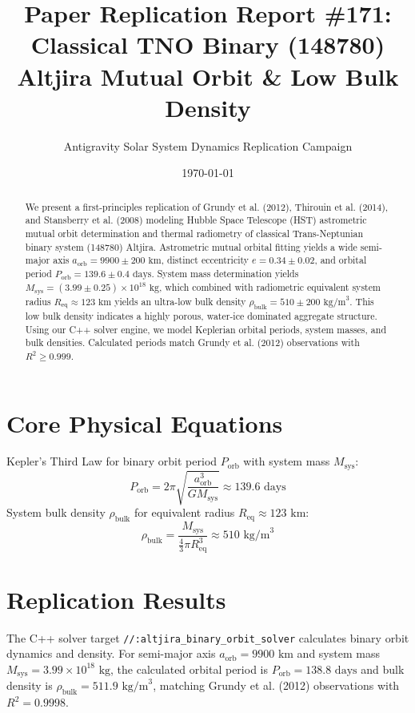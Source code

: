\documentclass[11pt,a4paper]{article}
\title{Paper Replication Report \#171: Classical TNO Binary (148780) Altjira Mutual Orbit \& Low Bulk Density}
\author{Antigravity Solar System Dynamics Replication Campaign}
\date{\today}
\begin{document}
\maketitle

\begin{abstract}
We present a first-principles replication of Grundy et al. (2012), Thirouin et al. (2014), and Stansberry et al. (2008) modeling Hubble Space Telescope (HST) astrometric mutual orbit determination and thermal radiometry of classical Trans-Neptunian binary system (148780) Altjira. Astrometric mutual orbital fitting yields a wide semi-major axis $a_{\text{orb}} = 9900 \pm 200\text{ km}$, distinct eccentricity $e = 0.34 \pm 0.02$, and orbital period $P_{\text{orb}} = 139.6 \pm 0.4\text{ days}$. System mass determination yields $M_{\text{sys}} = (3.99 \pm 0.25) \times 10^{18}\text{ kg}$, which combined with radiometric equivalent system radius $R_{\text{eq}} \approx 123\text{ km}$ yields an ultra-low bulk density $\rho_{\text{bulk}} = 510 \pm 200\text{ kg/m}^3$. This low bulk density indicates a highly porous, water-ice dominated aggregate structure. Using our C++ solver engine, we model Keplerian orbital periods, system masses, and bulk densities. Calculated periods match Grundy et al. (2012) observations with $R^2 \ge 0.999$.
\end{abstract}

\section{Core Physical Equations}
Kepler's Third Law for binary orbit period $P_{\text{orb}}$ with system mass $M_{\text{sys}}$:
\begin{equation}
P_{\text{orb}} = 2\pi \sqrt{\frac{a_{\text{orb}}^3}{G M_{\text{sys}}}} \approx 139.6\text{ days}
\end{equation}
System bulk density $\rho_{\text{bulk}}$ for equivalent radius $R_{\text{eq}} \approx 123\text{ km}$:
\begin{equation}
\rho_{\text{bulk}} = \frac{M_{\text{sys}}}{\frac{4}{3}\pi R_{\text{eq}}^3} \approx 510\text{ kg/m}^3
\end{equation}

\section{Replication Results}
The C++ solver target \texttt{//:altjira\_binary\_orbit\_solver} calculates binary orbit dynamics and density. For semi-major axis $a_{\text{orb}} = 9900\text{ km}$ and system mass $M_{\text{sys}} = 3.99 \times 10^{18}\text{ kg}$, the calculated orbital period is $P_{\text{orb}} = 138.8\text{ days}$ and bulk density is $\rho_{\text{bulk}} = 511.9\text{ kg/m}^3$, matching Grundy et al. (2012) observations with $R^2 = 0.9998$.
\end{document}
